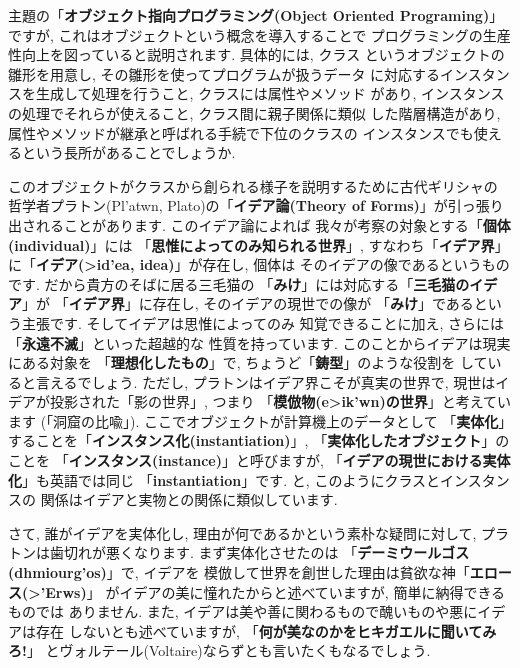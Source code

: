 \documentclass[b5j,8pt,twocolumn]{ltjsarticle}
\newcommand{\textgreek}[1]{\begingroup\fontencoding{LGR}\selectfont#1\endgroup}
\begin{document}
主題の「\textbf{オブジェクト指向プログラミング(Object Oriented
 Programing)}」ですが, これはオブジェクトという概念を導入することで
プログラミングの生産性向上を図っていると説明されます. 具体的には, クラス
というオブジェクトの雛形を用意し, その雛形を使ってプログラムが扱うデータ
に対応するインスタンスを生成して処理を行うこと, クラスには属性やメソッド
があり, インスタンスの処理でそれらが使えること, クラス間に親子関係に類似
した階層構造があり, 属性やメソッドが継承と呼ばれる手続で下位のクラスの
インスタンスでも使えるという長所があることでしょうか.
\newline

このオブジェクトがクラスから創られる様子を説明するために古代ギリシャの
哲学者プラトン(\textgreek{Pl'atwn}, Plato)の「\textbf{イデア論(Theory
 of Forms)}」が引っ張り出されることがあります. このイデア論によれば
我々が考察の対象とする「\textbf{個体(individual)}」には
「\textbf{思惟によってのみ知られる世界}」, すなわち「\textbf{イデア界}」
に「\textbf{イデア(\textgreek{>id'ea}, idea)}」が存在し, 個体は
そのイデアの像であるというものです. だから貴方のそばに居る三毛猫の
「\textbf{みけ}」には対応する「\textbf{三毛猫のイデア}」が
「\textbf{イデア界}」に存在し, そのイデアの現世での像が
「\textbf{みけ}」であるという主張です. そしてイデアは思惟によってのみ
知覚できることに加え, さらには「\textbf{永遠不滅}」といった超越的な
性質を持っています. このことからイデアは現実にある対象を
「\textbf{理想化したもの}」で, ちょうど「\textbf{鋳型}」のような役割を
していると言えるでしょう. ただし, プラトンはイデア界こそが真実の世界で,
 現世はイデアが投影された「影の世界」, つまり
「\textbf{模倣物(\textgreek{e>ik'wn})の世界}」と考えています
(「洞窟の比喩」\cite{国家}). ここでオブジェクトが計算機上のデータとして
「\textbf{実体化}」することを「\textbf{インスタンス化(instantiation)}」, 
「\textbf{実体化したオブジェクト}」のことを
「\textbf{インスタンス(instance)}」と呼びますが, 
「\textbf{イデアの現世における実体化}」も英語では同じ
「\textbf{instantiation}」です. と, このようにクラスとインスタンスの
関係はイデアと実物との関係に類似しています. 
\newline

さて, 誰がイデアを実体化し, 理由が何であるかという素朴な疑問に対して,
 プラトンは歯切れが悪くなります. まず実体化させたのは
 「\textbf{デーミウールゴス(\textgreek{dhmiourg'os})}」で, イデアを
模倣して世界を創世した理由は貧欲な神「\textbf{エロース(\textgreek{>'Erws})}」
がイデアの美に憧れたからと述べていますが, 簡単に納得できるものでは
ありません. また, イデアは美や善に関わるもので醜いものや悪にイデアは存在
しないとも述べていますが, 「\textbf{何が美なのかをヒキガエルに聞いてみろ!}」
とヴォルテール(Voltaire)ならずとも言いたくもなるでしょう.
\newline
\end{document}
